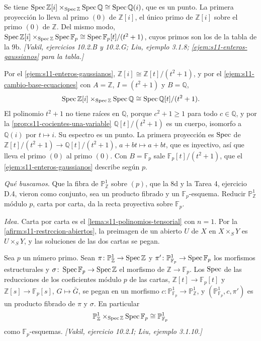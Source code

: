\begin{ejem}
\label{ejem:s11-gaussianos-sobre-q}
Se tiene \(\operatorname{Spec}\mathbb Z[i]\times_{\operatorname{Spec}\mathbb Z}\operatorname{Spec}\mathbb Q\cong\operatorname{Spec}\mathbb Q(i)\), que es un punto. La primera proyección lo lleva al primo \((0)\) de \(\mathbb Z[i]\), el único primo de \(\mathbb Z[i]\) sobre el primo \((0)\) de \(\mathbb Z\). Del mismo modo, \(\operatorname{Spec}\mathbb Z[i]\times_{\operatorname{Spec}\mathbb Z}\operatorname{Spec}\mathbb F_p\cong\operatorname{Spec}\mathbb F_p[t]/(t^2+1)\), cuyos primos son los de la tabla de la 9b. \emph{[Vakil, ejercicios 10.2.B y 10.2.G; Liu, ejemplo 3.1.8; \cref{ejem:s11-enteros-gaussianos} para la tabla.]}
\end{ejem}

Por el \cref{ejem:s11-enteros-gaussianos}, \(\mathbb Z[i]\cong\mathbb Z[t]/(t^2+1)\), y por el \cref{ejem:s11-cambio-base-ecuaciones} con \(A=\mathbb Z\), \(I=(t^2+1)\) y \(B=\mathbb Q\),
\[
 \operatorname{Spec}\mathbb Z[i]\times_{\operatorname{Spec}\mathbb Z}\operatorname{Spec}\mathbb Q\cong\operatorname{Spec}\mathbb Q[t]/(t^2+1).
\]
El polinomio \(t^2+1\) no tiene raíces en \(\mathbb Q\), porque \(c^2+1\ge1\) para todo \(c\in\mathbb Q\), y por la \cref{prop:s11-cocientes-una-variable} \(\mathbb Q[t]/(t^2+1)\) es un cuerpo, isomorfo a \(\mathbb Q(i)\) por \(t\mapsto i\). Su espectro es un punto. La primera proyección es \(\operatorname{Spec}\) de \(\mathbb Z[t]/(t^2+1)\to\mathbb Q[t]/(t^2+1)\), \(a+bt\mapsto a+bt\), que es inyectivo, así que lleva el primo \((0)\) al primo \((0)\). Con \(B=\mathbb F_p\) sale \(\mathbb F_p[t]/(t^2+1)\), que el \cref{ejem:s11-enteros-gaussianos} describe según \(p\).

\emph{Qué buscamos.} Que la fibra de \(\mathbb P^1_{\mathbb Z}\) sobre \((p)\), que la 8d y la Tarea 4, ejercicio D.4, vieron como conjunto, sea un producto fibrado y un \(\mathbb F_p\)-esquema. Reducir \(\mathbb P^1_{\mathbb Z}\) módulo \(p\), carta por carta, da la recta proyectiva sobre \(\mathbb F_p\).

\emph{Idea.} Carta por carta es el \cref{lema:s11-polinomios-tensorial} con \(n=1\). Por la \cref{afirm:s11-restrccion-abiertos}, la preimagen de un abierto \(U\) de \(X\) en \(X\times_S Y\) es \(U\times_S Y\), y las soluciones de las dos cartas se pegan.

\begin{lema}
\label{lema:s11-proyectiva-fp}
Sea \(p\) un número primo. Sean \(\pi\colon\mathbb P^1_{\mathbb Z}\to\operatorname{Spec}\mathbb Z\) y \(\pi'\colon\mathbb P^1_{\mathbb F_p}\to\operatorname{Spec}\mathbb F_p\) los morfismos estructurales y \(\sigma\colon\operatorname{Spec}\mathbb F_p\to\operatorname{Spec}\mathbb Z\) el morfismo de \(\mathbb Z\to\mathbb F_p\). Los \(\operatorname{Spec}\) de las reducciones de los coeficientes módulo \(p\) de las cartas, \(\mathbb Z[t]\to\mathbb F_p[t]\) y \(\mathbb Z[s]\to\mathbb F_p[s]\), \(G\mapsto\bar G\), se pegan en un morfismo \(c\colon\mathbb P^1_{\mathbb F_p}\to\mathbb P^1_{\mathbb Z}\), y \((\mathbb P^1_{\mathbb F_p},c,\pi')\) es un producto fibrado de \(\pi\) y \(\sigma\). En particular
\[
 \mathbb P^1_{\mathbb Z}\times_{\operatorname{Spec}\mathbb Z}\operatorname{Spec}\mathbb F_p\cong\mathbb P^1_{\mathbb F_p}
\]
como \(\mathbb F_p\)-esquemas. \emph{[Vakil, ejercicio 10.2.I; Liu, ejemplo 3.1.10.]}
\end{lema}

